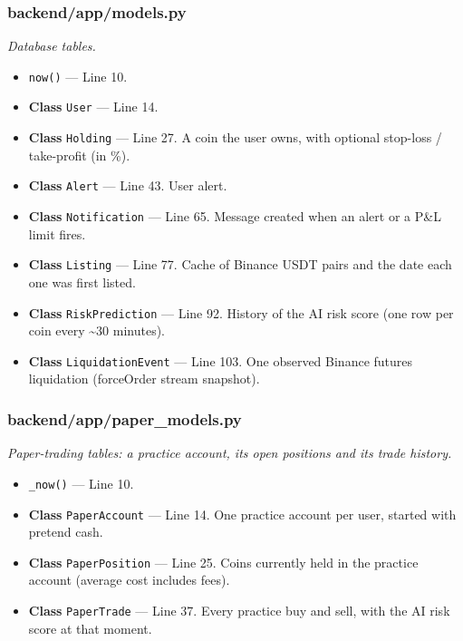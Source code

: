 \subsubsection*{backend/app/models.py}
\textit{Database tables.}
\begin{itemize}[nosep,leftmargin=1.5em]
\item \texttt{now(\allowbreak{})} --- Line 10.
\item \textbf{Class} \texttt{User} --- Line 14.
\item \textbf{Class} \texttt{Holding} --- Line 27. A coin the user owns, with optional stop-loss / take-profit (in \%).
\item \textbf{Class} \texttt{Alert} --- Line 43. User alert.
\item \textbf{Class} \texttt{Notification} --- Line 65. Message created when an alert or a P\&L limit fires.
\item \textbf{Class} \texttt{Listing} --- Line 77. Cache of Binance USDT pairs and the date each one was first listed.
\item \textbf{Class} \texttt{RiskPrediction} --- Line 92. History of the AI risk score (one row per coin every \textasciitilde{}30 minutes).
\item \textbf{Class} \texttt{LiquidationEvent} --- Line 103. One observed Binance futures liquidation (forceOrder stream snapshot).
\end{itemize}
\subsubsection*{backend/app/paper\_models.py}
\textit{Paper-trading tables: a practice account, its open positions and its trade history.}
\begin{itemize}[nosep,leftmargin=1.5em]
\item \texttt{\_\allowbreak{}now(\allowbreak{})} --- Line 10.
\item \textbf{Class} \texttt{PaperAccount} --- Line 14. One practice account per user, started with pretend cash.
\item \textbf{Class} \texttt{PaperPosition} --- Line 25. Coins currently held in the practice account (average cost includes fees).
\item \textbf{Class} \texttt{PaperTrade} --- Line 37. Every practice buy and sell, with the AI risk score at that moment.
\end{itemize}
